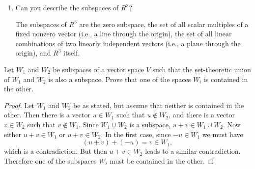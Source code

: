 \begin{enumerate}
\begin{proof}
    Let $\alpha = (a_1,a_2)$ and $\beta = (b_1,b_2)$. Also let
    $\gamma = (c_1,c_2)$ be any element in $R^2$. Then $\gamma$ is a
    linear combination of $\alpha$ and $\beta$ if and only if the
    system of equations
    \begin{alignat*}{3}
      a_1x_1 &{}+{}& b_1x_2 &{}={}& c_1 \\
      a_2x_1 &{}+{}& b_2x_2 &{}={}& c_2
    \end{alignat*}
    has a solution. Suppose the coefficient matrix
    \begin{equation*}
      \begin{bmatrix}
        a_1 & b_1 \\
        a_2 & b_2
      \end{bmatrix}
    \end{equation*}
    is not invertible. By
    Exercise~\ref{exercise:lin-eq:2-by-2-inv-crit}, we then know that
    $a_1b_2 - a_2b_1 = 0$. Now, one of $a_1$ and $a_2$ is nonzero. If
    $a_1\neq0$, then
    \begin{equation*}
      b_2 = \frac{b_1}{a_1}\cdot a_2.
    \end{equation*}
    Also
    \begin{equation*}
      b_1 = \frac{b_1}{a_1}\cdot a_1,
    \end{equation*}
    and we have a contradiction since $\beta$ was assumed to not be a
    scalar multiple of $\alpha$. Similarly $a_2\neq0$ also leads to a
    contradiction. This shows that the system of equations above has a
    solution, so that $W = R^2$.
  \end{proof}
\item Can you describe the subspaces of $R^3$?
  \begin{solution}
    The subspaces of $R^3$ are the zero subspace, the set of all
    scalar multiples of a fixed nonzero vector (i.e., a line through
    the origin), the set of all linear combinations of two linearly
    independent vectors (i.e., a plane through the origin), and $R^3$
    itself.
  \end{solution}
\end{enumerate}

 Let $W_1$ and $W_2$ be subspaces of a vector space $V$ such
that the set-theoretic union of $W_1$ and $W_2$ is also a
subspace. Prove that one of the spaces $W_i$ is contained in the
other.
\begin{proof}
  Let $W_1$ and $W_2$ be as stated, but assume that neither is
  contained in the other. Then there is a vector $u\in W_1$ such that
  $u\not\in W_2$, and there is a vector $v\in W_2$ such that
  $v\not\in W_1$. Since $W_1\cup W_2$ is a subspace,
  $u + v\in W_1\cup W_2$. Now either $u+v\in W_1$ or $u+v\in W_2$. In
  the first case, since $-u\in W_1$ we must have
  \begin{equation*}
    (u+v)+(-u) = v \in W_1,
  \end{equation*}
  which is a contradiction. But then $u+v\in W_2$ leads to a similar
  contradiction. Therefore one of the subspaces $W_i$ must be
  contained in the other.
\end{proof}
